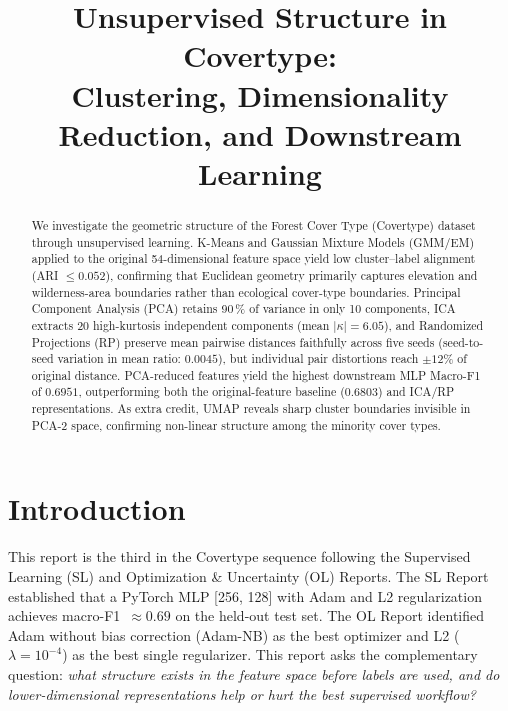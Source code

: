 \documentclass[conference]{IEEEtran}
\begin{document}
\graphicspath{{../results/figures/}{./results/figures/}}

\title{\color{denimdark}Unsupervised Structure in Covertype:\\
       Clustering, Dimensionality Reduction, and Downstream Learning}

\author{
}

\maketitle

\begin{abstract}
We investigate the geometric structure of the Forest Cover Type (Covertype)
dataset through unsupervised learning. K-Means and Gaussian Mixture Models
(GMM/EM) applied to the original 54-dimensional feature space yield low
cluster--label alignment (ARI $\leq 0.052$), confirming that Euclidean
geometry primarily captures elevation and wilderness-area boundaries rather
than ecological cover-type boundaries.
Principal Component Analysis (PCA) retains 90\,\% of variance in only 10
components, ICA extracts 20 high-kurtosis independent components
(mean $|\kappa|{=}6.05$), and Randomized Projections (RP) preserve mean pairwise distances
faithfully across five seeds (seed-to-seed variation in mean ratio: $0.0045$),
but individual pair distortions reach ${\pm}12\%$ of original distance.
PCA-reduced features yield the highest downstream MLP Macro-F1 of
$\mathbf{0.6951}$, outperforming both the original-feature baseline
(0.6803) and ICA/RP representations.
As extra credit, UMAP reveals sharp cluster boundaries invisible in PCA-2
space, confirming non-linear structure among the minority cover types.
\end{abstract}

\section{Introduction}\label{sec:intro}

This report is the third in the Covertype sequence following the Supervised
Learning (SL) and Optimization \& Uncertainty (OL) Reports.
The SL Report established that a PyTorch MLP [256, 128] with Adam and L2
regularization achieves macro-F1~$\approx 0.69$ on the held-out test set.
The OL Report identified Adam without bias correction (Adam-NB) as the best
optimizer and L2 ($\lambda{=}10^{-4}$) as the best single regularizer.
This report asks the complementary question: \emph{what structure exists in
the feature space before labels are used, and do lower-dimensional
representations help or hurt the best supervised workflow?}
\end{document}
